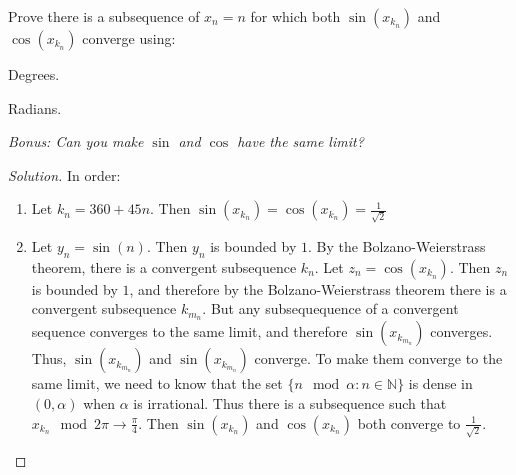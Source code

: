 \documentclass[crop=false,class=article,oneside]{standalone}
\begin{document}
        \begin{problem}
            Prove there is a subsequence of $x_{n}=n$ for which
            both $\sin(x_{k_{n}})$ and $\cos(x_{k_{n}})$
            converge using:
            \begin{enumerate}
                \begin{multicols}{2}
                    \item Degrees.
                    \item Radians.
                \end{multicols}
            \end{enumerate}
            \textit{%
                Bonus: Can you make $\sin$ and $\cos$
                have the same limit?
            }
        \end{problem}
        \begin{proof}[Solution]
            In order:
            \begin{enumerate}
                \item Let $k_{n}=360+45n$. Then
                      $\sin(x_{k_n})=\cos(x_{k_{n}})%
                       =\frac{1}{\sqrt{2}}$
                \item Let $y_{n}=\sin(n)$. Then $y_{n}$ is bounded
                      by $1$. By the Bolzano-Weierstrass theorem,
                      there is a convergent subsequence $k_{n}$.
                      Let $z_{n}=\cos(x_{k_{n}})$. Then $z_{n}$
                      is bounded by $1$, and therefore by the
                      Bolzano-Weierstrass theorem there is a
                      convergent subsequence $k_{m_{n}}$. But
                      any subsequequence of a convergent sequence
                      converges to the same limit, and therefore
                      $\sin(x_{k_{m_{n}}})$ converges. Thus,
                      $\sin(x_{k_{m_{n}}})$ and
                      $\sin(x_{k_{m_{n}}})$ converge. To make
                      them converge to the same limit, we need
                      to know that the set
                      $\{n\mod\alpha:n\in\mathbb{N}\}$ is dense
                      in $(0,\alpha)$ when $\alpha$ is
                      irrational. Thus there is a
                      subsequence such that
                      $x_{k_{n}}\mod{2\pi}%
                       \rightarrow{\frac{\pi}{4}}$. Then
                      $\sin(x_{k_{n}})$ and
                      $\cos(x_{k_{n}})$ both converge to
                      $\frac{1}{\sqrt{2}}$.
                      
            \end{enumerate}
        \end{proof}
\end{document}
